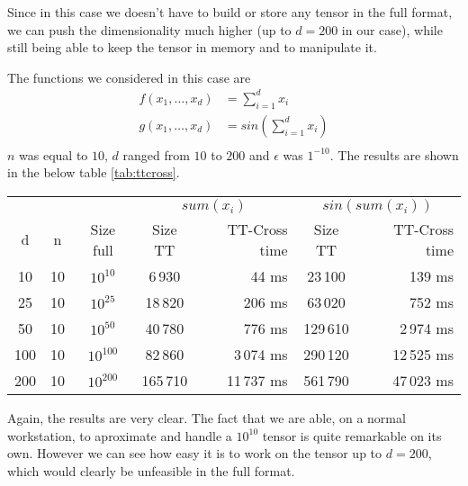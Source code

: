 Since in this case we doesn't have to build or store any tensor in the full format, we can push the dimensionality much higher (up to $d = 200$ in our case), while still being able to keep the tensor in memory and to manipulate it.

The functions we considered in this case are
\begin{align*}
  f(x_1,\ldots,x_d) &= \sum_{i=1}^{d} x_i\\
  g(x_1,\ldots,x_d) &= sin(\sum_{i=1}^{d} x_i)\\
\end{align*}
$n$ was equal to $10$, $d$ ranged from $10$ to $200$ and $\epsilon$ was $1^{-10}$.
The results are shown in the below table \ref{tab:ttcross}.

\begin{center}
  \begin{tabular}[t]{ccccrcr}
    \toprule
      &    &           & \multicolumn{2}{c}{$sum(x_i)$} & \multicolumn{2}{c}{$sin(sum(x_i))$}\\
    d & n  & Size full & Size TT & TT-Cross time & Size TT & TT-Cross time\\ \midrule
    10  &10   &$10^{10}$      &6\,930     & 44 ms    &23\,100    & 139 ms\\
    25  &10   &$10^{25}$      &18\,820    & 206 ms    &63\,020    & 752 ms\\
    50  &10   &$10^{50}$      &40\,780    & 776 ms    &129\,610   &2\,974 ms\\
    100 &10   &$10^{100}$     &82\,860    &3\,074 ms    &290\,120   &12\,525 ms\\
    200 &10   &$10^{200}$     &165\,710   &11\,737 ms    &561\,790   &47\,023 ms\\ \bottomrule
  \end{tabular}
\end{center}

Again, the results are very clear.
The fact that we are able, on a normal workstation, to aproximate and handle a $10^{10}$ tensor is quite remarkable on its own. However we can see how easy it is to work on the tensor up to $d = 200$, which would clearly be unfeasible in the full format.

